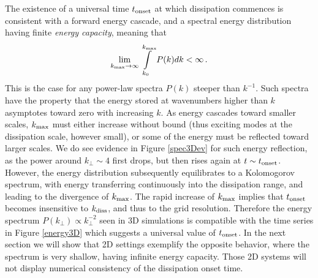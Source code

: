 The existence of a universal time $t_{\rm onset}$ at which dissipation commences is consistent with a forward energy cascade, and a spectral energy distribution having finite \textit{energy capacity}, meaning that
%
\begin{equation}
	\lim \limits_{k_{\rm max} \rightarrow \infty} \int \limits_{k_0}^{k_{\rm max}} P(k) dk < \infty \, .
\end{equation}
%
This is the case for any power-law spectra $P(k)$ steeper than $k^{-1}$.
Such spectra have the property that the energy stored at wavenumbers higher than $k$ asymptotes toward zero with increasing $k$.
As energy cascades toward smaller scales, $k_{\rm max}$ must either increase without bound (thus exciting modes at the dissipation scale, however small), or some of the energy must be reflected toward larger scales.
We do see evidence in Figure \ref{spec3Dev} for such energy reflection, as the power around $k_\perp \sim 4$ first drops, but then rises again at $t \sim t_{\rm onset}$.
However, the energy distribution subsequently equilibrates to a Kolomogorov spectrum, with energy transferring continuously into the dissipation range, and leading to the divergence of $k_{\rm max}$.
The rapid increase of $k_{\rm max}$ implies that $t_{\rm onset}$ becomes insensitive to $k_{\rm diss}$, and thus to the grid resolution.
Therefore the energy spectrum $P(k_\perp) \propto k_\perp^{-2}$ seen in 3D simulations is compatible with the time series in Figure \ref{energy3D} which suggests a universal value of $t_{\rm onset}$.
In the next section we will show that 2D settings exemplify the opposite behavior, where the spectrum is very shallow, having infinite energy capacity.
Those 2D systems will not display numerical consistency of the dissipation onset time.


